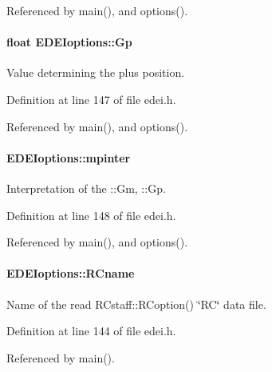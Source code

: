 Referenced by main(), and options().

\hypertarget{structEDEIoptions_a849c6335c3368bb43cc774e27ab9103d}{
\paragraph[{Gp}]{\setlength{\rightskip}{0pt plus 5cm}float {\bf EDEIoptions::Gp}}\hfill}
\label{structEDEIoptions_a849c6335c3368bb43cc774e27ab9103d}


Value determining the plus position. 



Definition at line 147 of file edei.h.



Referenced by main(), and options().

\hypertarget{structEDEIoptions_a8b89e570e1103169de51b967713a0b80}{
\paragraph[{mpinter}]{ {\bf EDEIoptions::mpinter}}\hfill}
\label{structEDEIoptions_a8b89e570e1103169de51b967713a0b80}


Interpretation of the ::Gm, ::Gp. 



Definition at line 148 of file edei.h.



Referenced by main(), and options().

\hypertarget{structEDEIoptions_af7da15cddac94d6eff13df82cb8c07fa}{
\paragraph[{RCname}]{ {\bf EDEIoptions::RCname}}\hfill}
\label{structEDEIoptions_af7da15cddac94d6eff13df82cb8c07fa}


Name of the read RCstaff::RCoption() \char`\"{}RC\char`\"{} data file. 



Definition at line 144 of file edei.h.



Referenced by main().


